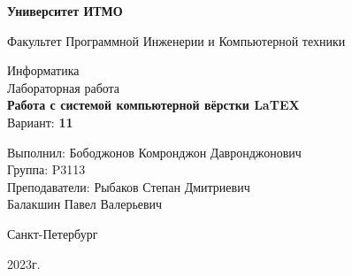 \thispagestyle{empty}
\begin{center}
    \textbf{Университет ИТМО}

    \vspace{1em}
    Факультет Программной Инженерии и Компьютерной техники

    \vspace{20em}
    
    {\small Информатика}\\[1em]
    {\Large Лабораторная работа }\\[1em]
    {\Large \textbf{Работа с системой компьютерной вёрстки LaTEX}}\\[1em]
    Вариант:  \textbf{11}
\end{center}

\vspace{12em}

\begin{flushright}
    Выполнил:
    Бободжонов Комронджон Давронджонович\\
    Группа: P3113\\
    Преподаватели:
    Рыбаков Степан Дмитриевич\\
    Балакшин Павел Валерьевич \\
\end{flushright}
\vspace{8em}
\vspace{\fill}

\begin{center}
Санкт-Петербург

2023г.
\end{center}